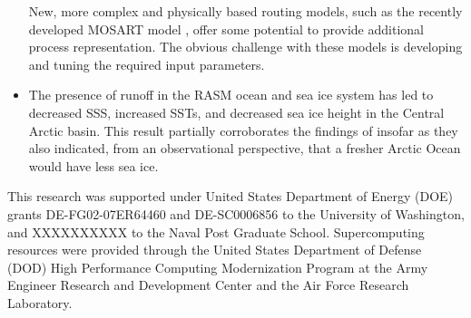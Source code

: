 \documentclass[jgrga, draft]{agutex}
\begin{document}
\begin{article}
\begin{itemize}
New, more complex and physically based routing models, such as the recently developed MOSART model \citep{Li_2013}, offer some potential to provide additional process representation.
The obvious challenge with these models is developing and tuning the required input parameters.
\item The presence of runoff in the RASM ocean and sea ice system has led to decreased SSS, increased SSTs, and decreased sea ice height in the Central Arctic basin.
This result partially corroborates the findings of \citep{Morison_2012} insofar as they also indicated, from an observational perspective, that a fresher Arctic Ocean would have less sea ice. %

\end{itemize}

%
%
%


\begin{acknowledgments}
This research was supported under United States Department of Energy (DOE) grants DE-FG02-07ER64460 and DE-SC0006856 to the University of Washington, and XXXXXXXXXX to the Naval Post Graduate School.
Supercomputing resources were provided through the United States Department of Defense (DOD) High Performance Computing Modernization Program at the Army Engineer Research and Development Center and the Air Force Research Laboratory.
\end{acknowledgments}





%
%
\end{article}


%
%
%
%
\end{document}
